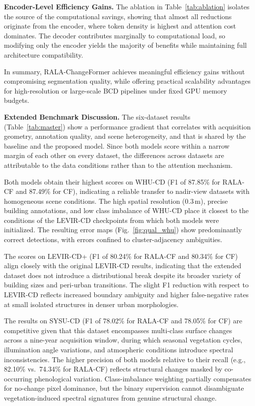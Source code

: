 \documentclass[runningheads]{llncs}
\newcommand{\journal}[1]{{\color{orange}#1}}
\begin{document}
\noindent \textbf{Encoder-Level Efficiency Gains.}
The ablation in Table~\ref{tab:ablation} isolates the source of the
computational savings, showing that almost all reductions originate from the
encoder, where token density is highest and attention cost dominates. The
decoder contributes marginally to computational load, so modifying only the
encoder yields the majority of benefits while maintaining full architecture
compatibility.

In summary, RALA-ChangeFormer achieves meaningful efficiency gains without
compromising segmentation quality, while offering practical scalability
advantages for high-resolution or large-scale BCD pipelines under fixed GPU
memory budgets.

\journal{%
\noindent \textbf{Extended Benchmark Discussion.}
The six-dataset results (Table~\ref{tab:master})
show a performance gradient that correlates with acquisition geometry,
annotation quality, and scene heterogeneity, and that is shared by the baseline
and the proposed model. Since both models score within a narrow margin of each
other on every dataset, the differences across datasets are attributable to the
data conditions rather than to the attention mechanism.

\noindent{\textbf{WHU-CD.}}
Both models obtain their highest scores on WHU-CD (F1 of 87.85\% for RALA-CF
and 87.49\% for CF), indicating a reliable transfer to nadir-view datasets
with homogeneous scene conditions. The high spatial resolution
($0.3\,\mathrm{m}$), precise building annotations, and low class imbalance of
WHU-CD place it closest to the conditions of the LEVIR-CD checkpoints from
which both models were initialized. The resulting error maps
(Fig.~\ref{fig:qual_whu}) show predominantly correct detections, with errors
confined to cluster-adjacency ambiguities.

\noindent{\textbf{LEVIR-CD+.}}
The scores on LEVIR-CD+ (F1 of 80.24\% for RALA-CF and 80.34\% for CF) align
closely with the original LEVIR-CD results, indicating that the extended
dataset does not introduce a distributional break despite its broader variety
of building sizes and peri-urban transitions. The slight F1 reduction with
respect to LEVIR-CD reflects increased boundary ambiguity and higher
false-negative rates at small isolated structures in denser urban
morphologies.

\noindent{\textbf{SYSU-CD.}}
The results on SYSU-CD (F1 of 78.02\% for RALA-CF and 78.05\% for CF) are
competitive given that this dataset encompasses multi-class surface changes
across a nine-year acquisition window, during which seasonal vegetation
cycles, illumination angle variations, and atmospheric conditions introduce
spectral inconsistencies. The higher precision of both models relative to
their recall (e.g., 82.10\% vs.\ 74.34\% for RALA-CF) reflects structural
changes masked by co-occurring phenological variation. Class-imbalance
weighting partially compensates for no-change pixel dominance, but the binary
supervision cannot disambiguate vegetation-induced spectral signatures from
genuine structural change.

}
\end{document}
